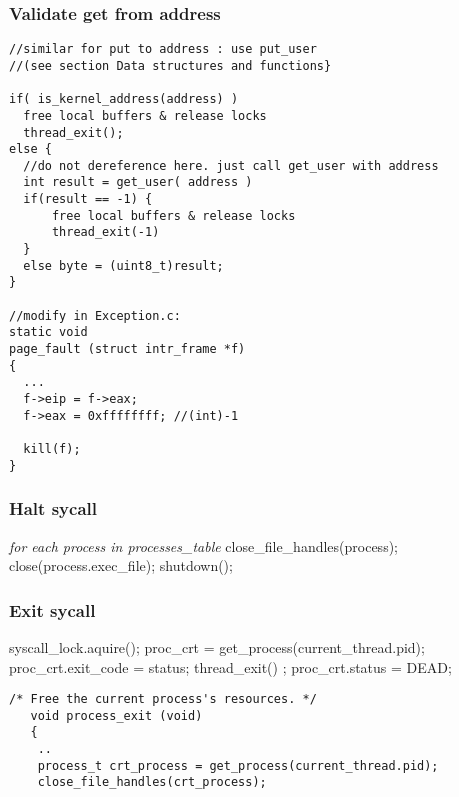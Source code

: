 {    \subsubsection{Validate get from address}
    \vspace{-1em} %
      \begin{lstlisting}
//similar for put to address : use put_user
//(see section Data structures and functions}

if( is_kernel_address(address) )
  free local buffers & release locks
  thread_exit(); 
else {
  //do not dereference here. just call get_user with address
  int result = get_user( address ) 
  if(result == -1) {
      free local buffers & release locks
      thread_exit(-1)
  }	
  else byte = (uint8_t)result;
}

//modify in Exception.c:
static void
page_fault (struct intr_frame *f)
{
  ...
  f->eip = f->eax;
  f->eax = 0xffffffff; //(int)-1
  
  kill(f);
}
      \end{lstlisting}

    \subsubsection{Halt sycall}
    \vspace{-3em} %
      \begin{program}
	\textit{for each process in processes\_table}
	\hspace{30pt}close\_file\_handles(process);
	\hspace{30pt}close(process.exec\_file);
	shutdown();
      \end{program}

    \subsubsection{Exit sycall}
    \vspace{-3em} %
      \begin{program}
	syscall\_lock.aquire();
	proc\_crt = get\_process(current\_thread.pid);
	proc\_crt.exit\_code = status;
	thread\_exit() ;
	proc\_crt.status = DEAD;
      \end{program}
    \begin{lstlisting}
/* Free the current process's resources. */	
   void process_exit (void)
   {
    ..
    process_t crt_process = get_process(current_thread.pid);
    close_file_handles(crt_process);
    

\end{lstlisting}}
